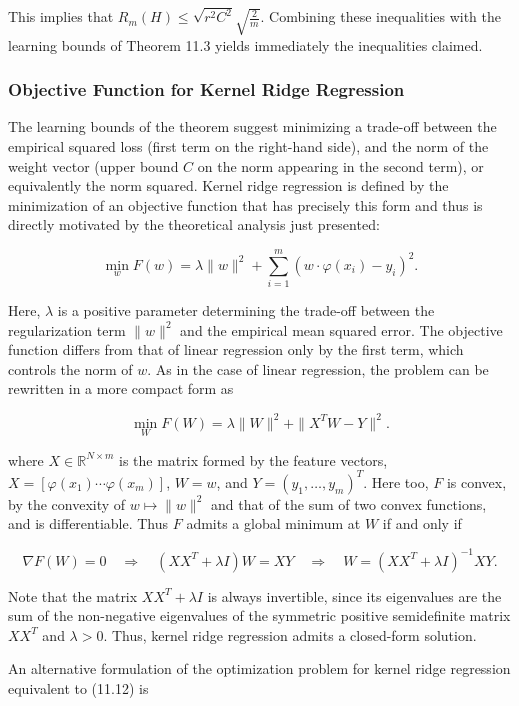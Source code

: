 \documentclass[fleqn,10pt]{olplainarticle}
\begin{document}
This implies that $R_m(H) \leq \sqrt{r^2C^2} \sqrt{\frac{2}{m}}$. Combining these inequalities with the learning bounds of Theorem 11.3 yields immediately the inequalities claimed.

\subsubsection{Objective Function for Kernel Ridge Regression}

The learning bounds of the theorem suggest minimizing a trade-off between the empirical squared loss (first term on the right-hand side), and the norm of the weight vector (upper bound $C$ on the norm appearing in the second term), or equivalently the norm squared. Kernel ridge regression is defined by the minimization of an objective function that has precisely this form and thus is directly motivated by the theoretical analysis just presented:

\[
\min_w F(w) = \lambda \|w\|^2 + \sum_{i=1}^{m} (w \cdot \varphi(x_i) - y_i)^2. \tag{11.12}
\]

Here, $\lambda$ is a positive parameter determining the trade-off between the regularization term $\|w\|^2$ and the empirical mean squared error. The objective function differs from that of linear regression only by the first term, which controls the norm of $w$. As in the case of linear regression, the problem can be rewritten in a more compact form as

\[
\min_W F(W) = \lambda \|W\|^2 + \|X^TW - Y\|^2. \tag{11.13}
\]

where $X \in \mathbb{R}^{N \times m}$ is the matrix formed by the feature vectors, $X = [\varphi(x_1) \cdots \varphi(x_m)]$, $W = w$, and $Y = (y_1, \ldots, y_m)^T$. Here too, $F$ is convex, by the convexity of $w \mapsto \|w\|^2$ and that of the sum of two convex functions, and is differentiable. Thus $F$ admits a global minimum at $W$ if and only if

\[
\nabla F(W) = 0 \quad \Rightarrow \quad (XX^T + \lambda I)W = XY \quad \Rightarrow \quad W = (XX^T + \lambda I)^{-1}XY. \tag{11.14}
\]

Note that the matrix $XX^T + \lambda I$ is always invertible, since its eigenvalues are the sum of the non-negative eigenvalues of the symmetric positive semidefinite matrix $XX^T$ and $\lambda > 0$. Thus, kernel ridge regression admits a closed-form solution.

An alternative formulation of the optimization problem for kernel ridge regression equivalent to (11.12) is
\end{document}
